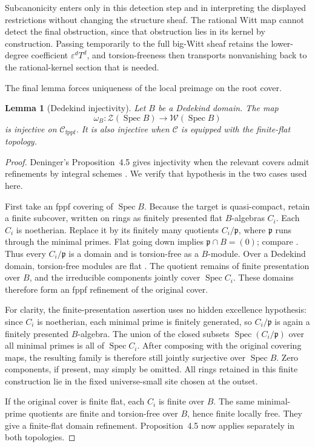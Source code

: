 \documentclass[11pt]{article}
\newtheorem{lemma}[theorem]{Lemma}
\theoremstyle{definition}
\newcommand{\Spec}{\operatorname{Spec}}
\newcommand{\Zsh}{\mathcal Z}
\newcommand{\Wsh}{\mathcal W}
\newcommand{\fppf}{\mathrm{fppf}}
\begin{document}
Subcanonicity enters only in this detection step and in interpreting the
displayed restrictions without changing the structure sheaf.  The
rational Witt map cannot detect the final obstruction, since that
obstruction lies in its kernel by construction.  Passing temporarily to
the full big-Witt sheaf retains the lower-degree coefficient
\(\varepsilon^dT^d\), and torsion-freeness then transports nonvanishing
back to the rational-kernel section that is needed.

The final lemma forces uniqueness of the local preimage on the root cover.

\begin{lemma}[Dedekind injectivity]\label{lem:dedekind}
Let \(B\) be a Dedekind domain.  The map
\[
 \omega_B\colon\Zsh(\Spec B)\longrightarrow\Wsh(\Spec B)
\]
is injective on \(\mathscr C_{\fppf}\).  It is also injective when
\(\mathscr C\) is equipped with the finite-flat topology.
\end{lemma}

\begin{proof}
Deninger's Proposition~4.5 gives injectivity when the relevant covers admit
refinements by integral schemes
\cite[Prop.~4.5, pp.~22--23]{Deninger2025Rational}.  We verify that
hypothesis in the two cases used here.

First take an fppf covering of \(\Spec B\).  Because the target is
quasi-compact, retain a finite subcover, written on rings as finitely
presented flat \(B\)-algebras \(C_i\).  Each \(C_i\) is noetherian.
Replace it by its finitely many quotients \(C_i/\mathfrak p\), where
\(\mathfrak p\) runs through the minimal primes.  Flat going down implies
\(\mathfrak p\cap B=(0)\); compare
\cite[Tag 00HS]{StacksProject}.  Thus every \(C_i/\mathfrak p\) is a
domain and is torsion-free as a \(B\)-module.  Over a Dedekind domain,
torsion-free modules are flat
\cite[Tag 0AUW]{StacksProject}.  The quotient remains of finite
presentation over \(B\), and the irreducible components jointly cover
\(\Spec C_i\).  These domains therefore form an fppf refinement of the
original cover.

For clarity, the finite-presentation assertion uses no hidden excellence
hypothesis: since \(C_i\) is noetherian, each minimal prime is finitely
generated, so \(C_i/\mathfrak p\) is again a finitely presented
\(B\)-algebra.  The union of the closed subsets
\(\Spec(C_i/\mathfrak p)\) over all minimal primes is all of
\(\Spec C_i\).  After composing with the original covering maps, the
resulting family is therefore still jointly surjective over \(\Spec B\).
Zero components, if present, may simply be omitted.
All rings retained in this finite construction lie in the fixed
universe-small site chosen at the outset.

If the original cover is finite flat, each \(C_i\) is finite over \(B\).
The same minimal-prime quotients are finite and torsion-free over \(B\),
hence finite locally free.  They give a finite-flat domain refinement.
Proposition~4.5 now applies separately in both topologies.
\end{proof}
\end{document}
